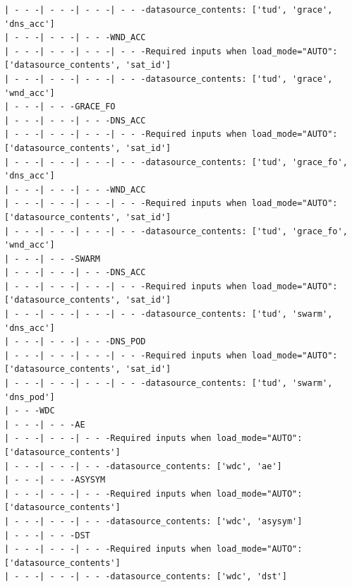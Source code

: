 \begin{verbatim}
| - - -| - - -| - - -| - - -datasource_contents: ['tud', 'grace', 'dns_acc']
| - - -| - - -| - - -WND_ACC
| - - -| - - -| - - -| - - -Required inputs when load_mode="AUTO": ['datasource_contents', 'sat_id']
| - - -| - - -| - - -| - - -datasource_contents: ['tud', 'grace', 'wnd_acc']
| - - -| - - -GRACE_FO
| - - -| - - -| - - -DNS_ACC
| - - -| - - -| - - -| - - -Required inputs when load_mode="AUTO": ['datasource_contents', 'sat_id']
| - - -| - - -| - - -| - - -datasource_contents: ['tud', 'grace_fo', 'dns_acc']
| - - -| - - -| - - -WND_ACC
| - - -| - - -| - - -| - - -Required inputs when load_mode="AUTO": ['datasource_contents', 'sat_id']
| - - -| - - -| - - -| - - -datasource_contents: ['tud', 'grace_fo', 'wnd_acc']
| - - -| - - -SWARM
| - - -| - - -| - - -DNS_ACC
| - - -| - - -| - - -| - - -Required inputs when load_mode="AUTO": ['datasource_contents', 'sat_id']
| - - -| - - -| - - -| - - -datasource_contents: ['tud', 'swarm', 'dns_acc']
| - - -| - - -| - - -DNS_POD
| - - -| - - -| - - -| - - -Required inputs when load_mode="AUTO": ['datasource_contents', 'sat_id']
| - - -| - - -| - - -| - - -datasource_contents: ['tud', 'swarm', 'dns_pod']
| - - -WDC
| - - -| - - -AE
| - - -| - - -| - - -Required inputs when load_mode="AUTO": ['datasource_contents']
| - - -| - - -| - - -datasource_contents: ['wdc', 'ae']
| - - -| - - -ASYSYM
| - - -| - - -| - - -Required inputs when load_mode="AUTO": ['datasource_contents']
| - - -| - - -| - - -datasource_contents: ['wdc', 'asysym']
| - - -| - - -DST
| - - -| - - -| - - -Required inputs when load_mode="AUTO": ['datasource_contents']
| - - -| - - -| - - -datasource_contents: ['wdc', 'dst']
\end{verbatim}